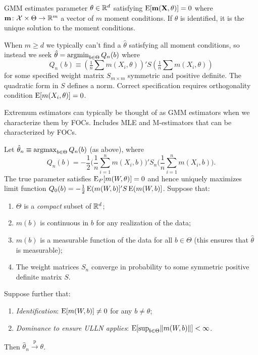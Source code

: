 \documentclass[8pt,letterpaper, landscape]{extarticle} %
\newcommand{\mX}{\ensuremath{\mathbf{X}}}
\begin{document}
\begin{multicols}{3}
\begin{description}
 GMM estimates parameter $ \theta \in \mathbb{R}^d $ satisfying $ \E [\mathbf{m}(\mX, \theta)] = 0 $ where $ \mathbf{m} \colon \mathcal{X} \times \Theta \to \mathbb{R}^m $ a vector of $ m $ moment conditions. If $ \theta $ is identified, it is the unique solution to the moment conditions.

When $ m \geq d $ we typically can't find a $ \hat{\theta} $ satisfying all moment conditions, so instead we seek $ \hat{\theta} = \operatorname*{argmin}_{b \in \Theta} Q_n (b) $ where
$$ Q_n(b) \equiv \left( \tfrac{1}{n} \sum m(X_i, \theta) \right)' S \left( \tfrac{1}{n} \sum m(X_i, \theta) \right) $$
for some specified weight matrix $ S_{m \times m} $ symmetric and positive definite. The quadratic form in $ S $ defines a norm. Correct specification requires orthogonality condition $ \operatorname{E} [m(X_i, \theta)] = 0 $.

Extremum estimators can typically be thought of as GMM estimators when we characterize them by FOCs. Includes MLE and M-estimators that can be characterized by FOCs.

 Let $ \hat{\theta}_n \equiv \operatorname*{argmax}_{b \in \Theta} Q_n (b) $ (as above), where
$$ Q_n(b) = - \frac{1}{2} \biggl ( \frac{1}{n} \sum_{i=1}^{n} m(X_i, b) \biggr )' S_n \biggl ( \frac{1}{n} \sum_{i=1}^{n} m(X_i, b) \biggr ). $$
The true parameter satisfies $ \operatorname{E}_P [m(W, \theta)] = 0 $ and hence uniquely maximizes limit function $ Q_0 (b) = -\tfrac{1}{2} \operatorname{E} (m(W,b)]' S \operatorname{E} (m(W,b)] $. Suppose that:
\begin{enumerate}
\item $ \Theta $ is a \textit{compact} subset of $ \mathbb{R}^d $;
\item $ m (b) $ is continuous in $ b $ for any realization of the data;
\item $ m (b) $ is a measurable function of the data for all $ b \in \Theta $ (this ensures that $ \hat{\theta} $ is measurable);
\item The weight matrices $ S_n $ converge in probability to some symmetric positive definite matrix $ S $.
\end{enumerate}
Suppose further that:
\begin{enumerate}
\item \textit{Identification}: $ \operatorname{E} [m(W, b)] \neq 0 $ for any $ b \neq \theta $;
\item \textit{Dominance to ensure ULLN applies}: $ \operatorname{E} [ \sup_{b \in \Theta} \lVert m(W, b) \rVert] < \infty $.
\end{enumerate}
Then $ \hat{\theta}_n \xrightarrow{\text{p}} \theta $.


\end{description}
\end{multicols}
\end{document}
